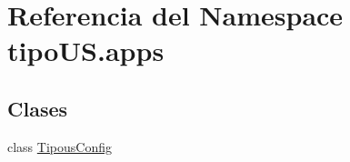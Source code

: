 \hypertarget{namespacetipo_u_s_1_1apps}{}\section{Referencia del Namespace tipo\+U\+S.\+apps}
\label{namespacetipo_u_s_1_1apps}
\subsection*{Clases}
\begin{DoxyCompactItemize}
\item 
class \hyperlink{classtipo_u_s_1_1apps_1_1_tipous_config}{Tipous\+Config}
\end{DoxyCompactItemize}
